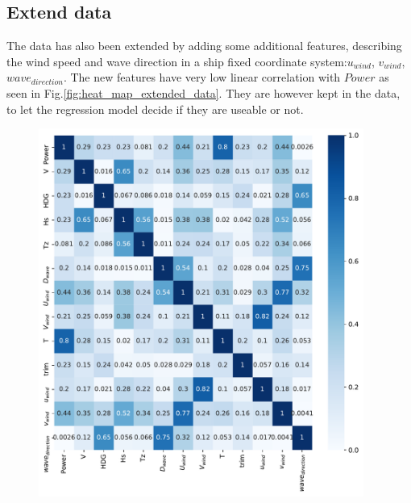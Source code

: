 \subsection*{Extend data}\label{extend-data}
The data has also been extended by adding some additional features,
describing the wind speed and wave direction in a ship fixed coordinate
system:$u_{wind}$, $v_{wind}$, $wave_{direction}$. The new
features have very low linear correlation with $Power$ as seen in
Fig.\ref{fig:heat_map_extended_data}. They are however kept in
the data, to let the regression model decide if they are useable or not.
\begin{figure}[H]
\begin{center}\includegraphics[width = 0.95\textwidth]{figures/output_25_0.pdf}\end{center}
\vspace{-0.7cm}
\caption{}
\label{fig:}
\end{figure}
